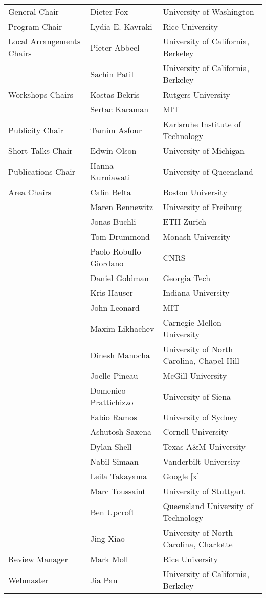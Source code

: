 \begin{tabular}{>{\raggedleft}p{5cm}p{4.5cm}>{\small}p{7cm}}
General Chair & Dieter Fox & University of Washington\\
Program Chair & Lydia E. Kavraki & Rice University\\
Local Arrangements Chairs & Pieter Abbeel & University of California, Berkeley\\
& Sachin Patil & University of California, Berkeley\\
Workshops Chairs & Kostas Bekris & Rutgers University\\
& Sertac Karaman & MIT\\
Publicity Chair & Tamim Asfour & Karlsruhe Institute of Technology\\
Short Talks Chair & Edwin Olson & University of Michigan\\
Publications Chair & Hanna Kurniawati & University of Queensland\\[5mm]

Area Chairs & Calin Belta & Boston University\\
& Maren Bennewitz & University of Freiburg\\
& Jonas Buchli & ETH Zurich\\
& Tom Drummond & Monash University\\
& Paolo Robuffo Giordano & CNRS \\
& Daniel Goldman & Georgia Tech \\
& Kris Hauser & Indiana University \\
& John Leonard & MIT \\
& Maxim Likhachev & Carnegie Mellon University \\
& Dinesh Manocha & University of North Carolina, Chapel Hill\\
& Joelle Pineau & McGill University \\
& Domenico Prattichizzo & University of Siena \\
& Fabio Ramos & University of Sydney \\
& Ashutosh Saxena & Cornell University \\
& Dylan Shell & Texas A\&M University \\
& Nabil Simaan & Vanderbilt University \\
& Leila Takayama & Google [x] \\
& Marc Toussaint & University of Stuttgart \\
& Ben Upcroft & Queensland University of Technology \\
& Jing Xiao & University of North Carolina, Charlotte\\[5mm]

Review Manager & Mark Moll & Rice University\\
Webmaster &Jia Pan& University of California, Berkeley\\
\end{tabular}

